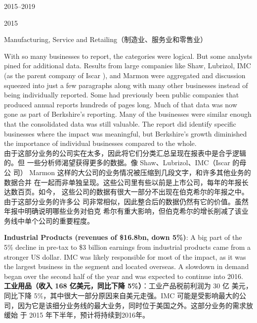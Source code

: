 \begin{chapter}{2015--2019}
\begin{section}{2015}
\begin{subsection}{Manufacturing, Service and Retailing（制造业、服务业和零售业）}
\begin{verseparallel}
  { With so many businesses to report, the categories were logical. But some
    analysts pined for additional data. Results from large companies like Shaw,
    Lubrizol, IMC (as the parent company of Iscar ), and Marmon were aggregated and
    discussion squeezed into just a few paragraphs along with many other
    businesses instead of being individually reported. Some had previously been
    public companies that produced annual reports hundreds of pages long. Much
    of that data was now gone as part of Berkshire’s reporting. Many of the
    businesses were similar enough that the consolidated data was still
    valuable. The report did identify specific businesses where the impact was
    meaningful, but Berkshire’s growth diminished the importance
    of individual businesses compared to the whole. \\
  } {由于这部分业务的公司实在太多，因此将它们分类汇总呈现在报表中是合乎逻辑的。但
    一些分析师渴望获得更多的数据。像 Shaw、Lubrizol、IMC（Iscar 的母公
    司） Marmon 这样的大公司的业务情况被压缩到几段文字，和许多其他业务的数据合并
    在一起而非单独呈现。这些公司里有些以前是上市公司，每年的年报长达数百页。如今，
    这些公司的数据有很大一部分不出现在伯克希尔的年报之中。由于这部分业务的许多公
    司非常相似，因此整合后的数据仍然有它的价值。虽然年报中明确说明哪些业务对伯克
    希尔有重大影响，但伯克希尔的增长削减了该业务线中单个公司的重要程度。}
\end{verseparallel}

\begin{verseparallel}
  {
    \textbf{Industrial Products (revenues of \$16.8bn, down 5\%)}: A big part of the 5\%
    decline in pre-tax to \$3 billion earnings from industrial products came
    from a stronger US dollar. IMC was likely responsible for most of the
    impact, as it was the largest business in the segment and located overseas.
    A slowdown in demand began over the second half of the year and was expected
    to continue into 2016. \\
  }
  {
    \textbf{工业用品（收入 168 亿美元，同比下降 5\%）}：工业产品税前利润为 30 亿
    美元，同比下降 5\%，其中很大一部分原因来自美元走强。IMC 可能是受影响最大的公
    司，因为它是该细分业务线的最大业务，同时位于美国之外。这部分业务的需求放缓始
    于 2015 年下半年，预计将持续到2016年。
  }
\end{verseparallel}


\end{subsection}
\end{section}
\end{chapter}
